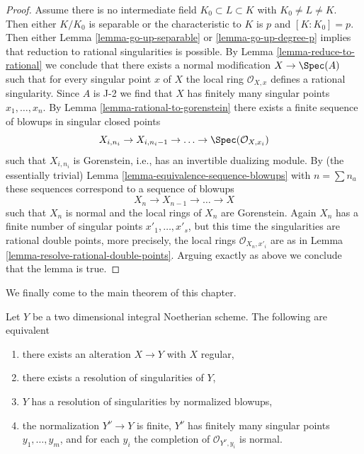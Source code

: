 \begin{proof}
\medskip\noindent
Assume there is no intermediate field $K_0 \subset L \subset K$
with $K_0 \not = L \not = K$. Then either $K/K_0$ is separable
or the characteristic to $K$ is $p$ and $[K : K_0] = p$.
Then either Lemma \ref{lemma-go-up-separable} or \ref{lemma-go-up-degree-p}
implies that reduction to rational singularities is possible.
By Lemma \ref{lemma-reduce-to-rational} we conclude that there exists a
normal modification $X \to \Spec(A)$ such that for
every singular point $x$ of $X$ the local ring $\mathcal{O}_{X, x}$
defines a rational singularity. Since $A$ is J-2 we find that $X$ has
finitely many singular points $x_1, \ldots, x_n$.
By Lemma \ref{lemma-rational-to-gorenstein}
there exists a finite sequence of blowups in singular closed points
$$
X_{i, n_i} \to X_{i, n_i - 1} \to \ldots \to \Spec(\mathcal{O}_{X, x_i})
$$
such that $X_{i, n_i}$ is Gorenstein, i.e., has an
invertible dualizing module. By (the essentially trivial)
Lemma \ref{lemma-equivalence-sequence-blowups}
with $n = \sum n_a$ these sequences correspond to a sequence of
blowups
$$
X_n \to X_{n - 1} \to \ldots \to X
$$
such that $X_n$ is normal and the local rings of $X_n$ are Gorenstein.
Again $X_n$ has a finite number of singular points
$x'_1, \ldots, x'_s$, but this time the singularities are
rational double points, more precisely, the local rings
$\mathcal{O}_{X_n, x'_i}$ are as in
Lemma \ref{lemma-resolve-rational-double-points}.
Arguing exactly as above we conclude that the lemma is true.
\end{proof}

\noindent
We finally come to the main theorem of this chapter.

\begin{theorem}[Lipman]
\label{theorem-resolve}
\begin{reference}
\cite[Theorem on page 151]{Lipman}
\end{reference}
Let $Y$ be a two dimensional integral Noetherian scheme. The following are
equivalent
\begin{enumerate}
\item there exists an alteration $X \to Y$ with $X$ regular,
\item there exists a resolution of singularities of $Y$,
\item $Y$ has a resolution of singularities by normalized blowups,
\item the normalization $Y^\nu \to Y$ is finite, $Y^\nu$ has
finitely many singular points $y_1, \ldots, y_m$, and for each
$y_i$ the completion of $\mathcal{O}_{Y^\nu, y_i}$ is normal.
\end{enumerate}
\end{theorem}

